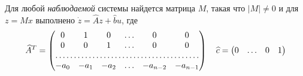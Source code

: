 \documentclass[../../TAU.tex]{subfiles}
\begin{document}
    \begin{statement}
        Для любой {\it наблюдаемой} системы  найдется матрица $M$, такая что $|M|\neq0$ и для $z=Mx$ выполнено
        $\dot z = \widehat A z + \widehat b u$,
        где
        $$
        \widehat A^T =
        \begin{pmatrix}
            0& 1& 0& \ldots& 0& 0\\
            0& 0& 1& \ldots& 0& 0\\
            \hdotsfor{6}\\
            -a_0& -a_1& -a_2 &\ldots& -a_{n-2}& -a_{n-1}
        \end{pmatrix}\quad
        \widehat c=
        \begin{pmatrix}
            0 & \ldots & 0 & 1
        \end{pmatrix}
        $$
    \end{statement}
\end{document}
